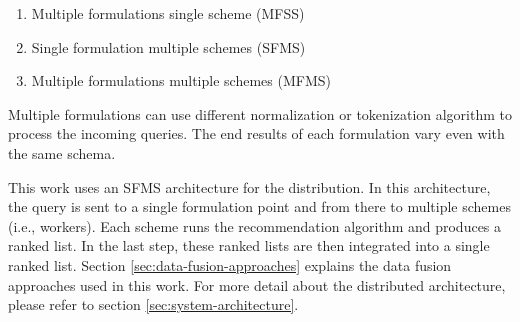 \begin{enumerate}
    \item Multiple formulations single scheme (MFSS)
    \item Single formulation multiple schemes (SFMS)
    \item Multiple formulations multiple schemes (MFMS)
\end{enumerate}


Multiple formulations can use different normalization or tokenization algorithm to process the incoming queries. The end results of each formulation vary even with the same schema.


This work uses an SFMS architecture for the distribution. In this architecture, the query is sent to a single formulation point and from there to multiple schemes (i.e., workers). Each scheme runs the recommendation algorithm and produces a ranked list. In the last step, these ranked lists are then integrated into a single ranked list. Section \ref{sec:data-fusion-approaches} explains the data fusion approaches used in this work. For more detail about the distributed architecture, please refer to section \ref{sec:system-architecture}.


